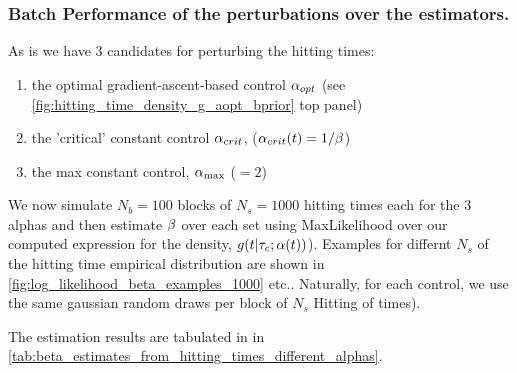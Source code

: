 \documentclass{article}
\begin{document}
\subsubsection{Batch Performance of the perturbations over the estimators.}
As is we have 3 candidates for perturbing the hitting times: 
\begin{enumerate}
  \item 
the optimal gradient-ascent-based  control ${\alpha}_{opt}$ (see
\cref{fig:hitting_time_density_g_aopt_bprior} top panel)
\item   the 'critical' constant control
${\alpha}_{crit}$, (${\alpha}_{crit}(t) = 1/{\beta}$)
\item  the max constant control, ${ {\alpha}_{\textrm{max}} }$ ($=2$)
\end{enumerate} 

We now simulate $N_b = 100$ blocks of $N_s=1000$ hitting times each for the
3 alphas and then estimate ${\beta}$ over each set using MaxLikelihood over our
computed expression for the density, $g(t|{ \tau_{c} }; {\alpha}(t) )$). Examples for
differnt $N_s$ of the hitting time empirical
distribution are shown in \cref{fig:log_likelihood_beta_examples_1000} etc..
Naturally, for each control, we use the same gaussian random draws per block of $N_s$ Hitting of times).

The estimation results are tabulated in in
\cref{tab:beta_estimates_from_hitting_times_different_alphas}.
\end{document}
